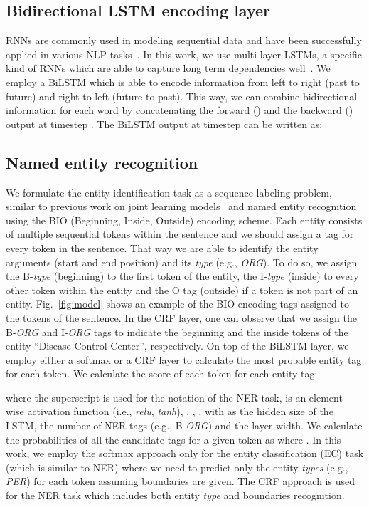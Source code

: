 \documentclass[review]{elsarticle}
\newcommand{\eg}{e.g., }
\newcommand{\ie}{i.e., }
\newcommand{\figref}[1]{Fig.~\ref{#1}}    \newcommand{\Figref}[1]{Figure~\ref{#1}}  \newcommand{\tabref}[1]{Table~\ref{#1}}
\begin{document}
\subsection{Bidirectional LSTM encoding layer} 
\label{subsec:lstms}

\noindent RNNs are commonly used in modeling sequential data and have been successfully applied in various NLP tasks~\citep{sutskever:14,lample:16,miwa:16}. In this work, we use multi-layer LSTMs, a specific kind of RNNs which are able to capture long term dependencies well~\citep{bengio:94,pascanu:13}.
We employ a BiLSTM which is able to encode information from left to right (past to future) and right to left (future to past). This way, we can combine bidirectional information for each word by concatenating the forward () and the backward () output at timestep . The BiLSTM output at timestep  can be written as:



\subsection{Named entity recognition}
\noindent We formulate the entity identification task as a sequence labeling problem, similar to previous work on joint learning models~\citep{miwa:16,li:17,katiyar:17} and named entity recognition~\citep{lample:16,ma:16} using the BIO (Beginning, Inside, Outside) encoding scheme. 
Each entity consists of multiple sequential tokens within the sentence and we should assign a tag for every token in the sentence. That way we are able to identify the entity arguments (start and end position) and its \emph{type} (\eg \emph{ORG}). To do so, we assign the B-\emph{type} (beginning) to the first token of the entity, the I-\emph{type} (inside) to every other token within the entity and the O tag (outside) if a token is not part of an entity.
\figref{fig:model} shows an example of the BIO encoding tags assigned to the tokens of the sentence. In the CRF layer, one can observe that we assign the B-\emph{ORG} and I-\emph{ORG} tags to indicate the beginning and the inside tokens of the entity ``Disease Control Center'', respectively. On top of the BiLSTM layer, we employ either a softmax or a CRF layer to calculate the most probable entity tag for each token. We calculate the score of each token  for each entity tag:

where the superscript  is used for the notation of the NER task,  is an element-wise activation function (\ie \emph{relu}, \emph{tanh}), , , , with  as the hidden size of the LSTM,  the number of NER tags (\eg B-\emph{ORG}) and  the layer width. We calculate the probabilities of all the candidate tags for a given token  as 
where .
In this work, we employ the softmax approach only for the entity classification (EC) task (which is similar to NER) where we need to predict only the entity \emph{types} (\eg \emph{PER}) for each token assuming boundaries are given. The CRF approach is used for the NER task which includes both entity \emph{type} and boundaries recognition.
\end{document}

